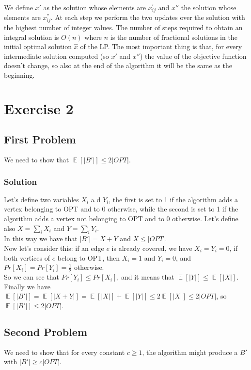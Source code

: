 \documentclass[11pt]{article}
\begin{document}
We define $x'$ as the solution whose elements are $x_{ij}^{'}$ and $x''$ the solution whose elements are $x_{ij}^{''}$. At each step we perform the two updates over the solution with the highest number of integer values. The number of steps required to obtain an integral solution is $O(n)$ where $n$ is the number of fractional solutions in the initial optimal solution $\hat{x}$ of the LP. The most important thing is that, for every intermediate solution computed (so $x'$ and $x''$) the value of the objective function doesn't change, so also at the end of the algorithm it will be the same as the beginning.

\newpage

\section*{Exercise 2}
\subsection*{First Problem}
We need to show that $\mathop{\mathbb{E}}[|B'|] \le 2|OPT|$.
\subsubsection*{Solution}
Let's define two variables $X_i$ a d $Y_i$, the first is set to 1 if the algorithm adds a vertex belonging to OPT and to 0 otherwise, while the second is set to 1 if the algorithm adds a vertex not belonging to OPT and to 0 otherwise. Let's define also $X = \sum\limits_{i}X_i$ and $Y = \sum\limits_{i}Y_i$. \\
In this way we have that $|B'| = X + Y$ and $X \le |OPT|$. \\
Now let's consider this: if an edge $e$ is already covered, we have $X_i = Y_i = 0$, if both vertices of $e$ belong to OPT, then $X_i = 1$ and $Y_i = 0$, and $Pr[X_i] = Pr[Y_i] = \frac{1}{2}$ otherwise. \\
So we can see that $Pr[Y_i] \le Pr[X_i]$, and it means that $\mathop{\mathbb{E}}[|Y|] \le \mathop{\mathbb{E}}[|X|]$. \\
Finally we have $\mathop{\mathbb{E}}[|B'|] = \mathop{\mathbb{E}}[|X + Y|] = \mathop{\mathbb{E}}[|X|] + \mathop{\mathbb{E}}[|Y|] \le 2\mathop{\mathbb{E}}[|X|] \le 2|OPT|$, so $\mathop{\mathbb{E}}[|B'|] \le 2|OPT|$.

\subsection*{Second Problem}
We need to show that for every constant $c \ge 1$, the algorithm might produce a $B'$ with $|B'| \ge c|OP T|$.
\end{document}
